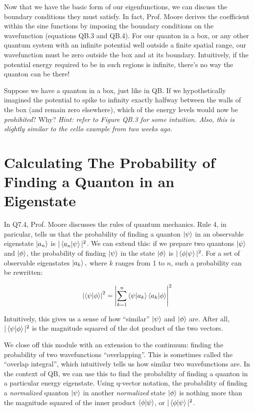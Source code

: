 \documentclass{article}
\begin{document}
Now that we have the basic form of our eigenfunctions, we can discuss the boundary conditions they must satisfy. In fact, Prof. Moore derives the coefficient within the sine functions by imposing the boundary conditions on the wavefunction (equations QB.3 and QB.4). For our quanton in a box, or any other quantum system with an infinite potential well outside a finite spatial range, our wavefunction must be zero outside the box and at its boundary. Intuitively, if the potential energy required to be in such regions is infinite, there's no way the quanton can be there!

\begin{tcolorbox}[colframe=blue!50!black, arc=2mm, title=\textsc{Practice 2}]
    Suppose we have a quanton in a box, just like in QB. If we hypothetically imagined the potential to spike to infinity exactly halfway between the walls of the box (and remain zero elsewhere), which of the energy levels would now be \textit{prohibited}? Why? \textit{Hint: refer to Figure QB.3 for some intuition. Also, this is slightly similar to the cello example from two weeks ago.}
\end{tcolorbox}

\section*{Calculating The Probability of Finding a Quanton in an Eigenstate}

In Q7.4, Prof. Moore discusses the rules of quantum mechanics. Rule 4, in paricular, tells us that the probability of finding a quanton $\ket{\psi}$ in an observable eigenstate $\ket{a_n}$ is $|\braket{a_n}{\psi}|^2$. We can extend this: if we prepare two quantons $\ket{\psi}$ and $\ket{\phi}$, the probability of finding $\ket{\psi}$ in the state $\ket{\phi}$ is $|\braket{\phi}{\psi}|^2$. For a set of observable eigenstates $\ket{a_k},$ where $k$ ranges from 1 to $n$, such a probability can be rewritten:

\[
\left| \braket{\psi}{\phi} \right| ^ 2 = \left| \sum_{k=1}^n \braket{\psi}{a_k} \braket{a_k}{\phi} \right|^2
\]

Intuitively, this gives us a sense of how ``similar'' $\ket{\psi}$ and $\ket{\phi}$ are. After all, $|\braket{\psi}{\phi}|^2$ is the magnitude squared of the dot product of the two vectors.

\vspace{1em}

We close off this module with an extension to the continuum: finding the probability of two wavefunctions ``overlapping''. This is sometimes called the ``overlap integral'', which intuitively tells us how similar two wavefunctions are. In the context of QB, we can use this to find the probability of finding a quanton in a particular energy eigenstate. Using q-vector notation, the probability of finding a \textit{normalized} quanton $\ket{\psi}$ in another \textit{normalized} state $\ket{\phi}$ is nothing more than the magnitude squared of the inner product $\braket{\phi}{\psi}$, or $|\braket{\phi}{\psi}|^2$.
\end{document}
